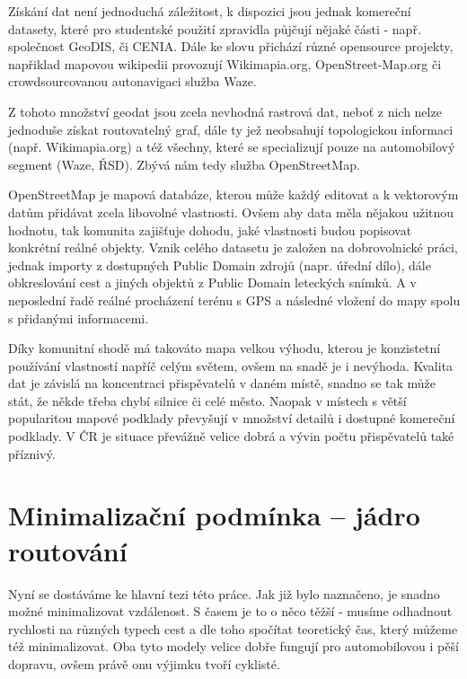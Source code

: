 \documentclass[thesis=B,czech]{FITthesis}[2012/06/26]
\begin{document}
Získání dat není jednoduchá záležitost, k dispozici jsou jednak komereční datasety, které pro studentské použití zpravidla půjčují nějaké části  - např. společnost GeoDIS, či CENIA. Dále ke slovu přichází různé opensource projekty, napřiklad mapovou wikipedii provozují Wikimapia.org, OpenStreet-Map.org či crowdsourcovanou autonavigaci služba Waze.

Z tohoto množství geodat jsou zcela nevhodná rastrová dat, neboť z nich nelze jednoduše získat routovatelný graf, dále ty jež neobsahují topologickou informaci (např. Wikimapia.org) a též všechny, které se specializují pouze na automobilový segment (Waze, ŘSD). Zbývá nám tedy služba OpenStreetMap.

OpenStreetMap je mapová databáze, kterou může každý editovat a k vektorovým datům přidávat zcela libovolné vlastnosti. Ovšem aby data měla nějakou užitnou hodnotu, tak komunita zajišťuje dohodu, jaké vlastnosti budou popisovat konkrétní reálné objekty. Vznik celého datasetu je založen na dobrovolnické práci, jednak importy z dostupných Public Domain zdrojů (napr. úřední dílo), dále obkreslování cest a jiných objektů z Public Domain leteckých snímků. A v neposlední řadě reálné procházení terénu s GPS a následné vložení do mapy spolu s přidanými informacemi.

Díky komunitní shodě má takováto mapa velkou výhodu, kterou je konzistetní používání vlastností napříč celým světem, ovšem na snadě je i nevýhoda. Kvalita dat je závislá na koncentraci přispěvatelů v daném místě, snadno se tak může stát, že někde třeba chybí silnice či celé město. Naopak v místech s větší popularitou mapové podklady převyšují v množství detailů i dostupné komereční podklady. V ČR je situace převážně velice dobrá a vývin počtu přispěvatelů také příznivý.


\section{Minimalizační podmínka -- jádro routování} 
\label{minimalizacniPodminka}


Nyní se dostáváme ke hlavní tezi této práce. Jak již bylo naznačeno, je snadno možné minimalizovat vzdálenost. S časem je to o něco těžší - musíme odhadnout rychlosti na různých typech cest a dle toho spočítat teoretický čas, který můžeme též minimalizovat. Oba tyto modely velice dobře fungují pro automobilovou i pěší dopravu, ovšem právě onu výjimku tvoří cyklisté.
\end{document}
